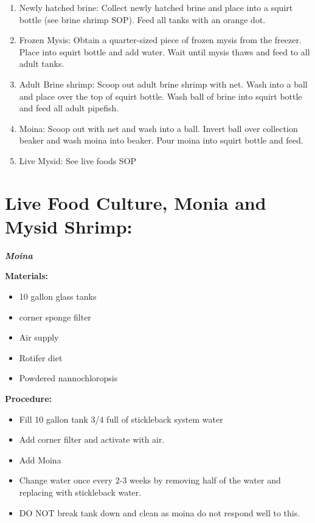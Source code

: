 \documentclass[
]{book}
\providecommand{\tightlist}{%
  \setlength{\itemsep}{0pt}\setlength{\parskip}{0pt}}
\begin{document}
\begin{enumerate}
\def\labelenumi{\arabic{enumi}.}
\tightlist
\item
  Newly hatched brine: Collect newly hatched brine and place into a squirt bottle (see brine shrimp SOP). Feed all tanks with an orange dot.
\item
  Frozen Mysis: Obtain a quarter-sized piece of frozen mysis from the freezer. Place into squirt bottle and add water. Wait until mysis thaws and feed to all adult tanks.
\item
  Adult Brine shrimp: Scoop out adult brine shrimp with net. Wash into a ball and place over the top of squirt bottle. Wash ball of brine into squirt bottle and feed all adult pipefish.
\item
  Moina: Scoop out with net and wash into a ball. Invert ball over collection beaker and wash moina into beaker. Pour moina into squirt bottle and feed.
\item
  Live Mysid: See live foods SOP
\end{enumerate}

\hypertarget{live-food-culture-monia-and-mysid-shrimp}{%
\section{\texorpdfstring{\textbf{Live Food Culture, Monia and Mysid Shrimp:}}{Live Food Culture, Monia and Mysid Shrimp:}}\label{live-food-culture-monia-and-mysid-shrimp}}

\textbf{\emph{Moina}}

\textbf{Materials:}

\begin{itemize}
\tightlist
\item
  10 gallon glass tanks
\item
  corner sponge filter
\item
  Air supply
\item
  Rotifer diet
\item
  Powdered nannochloropsis
\end{itemize}

\textbf{Procedure:}

\begin{itemize}
\tightlist
\item
  Fill 10 gallon tank 3/4 full of stickleback system water
\item
  Add corner filter and activate with air.
\item
  Add Moina
\item
  Change water once every 2-3 weeks by removing half of the water and replacing with stickleback water.
\item
  DO NOT break tank down and clean as moina do not respond well to this.
\end{itemize}
\end{document}
